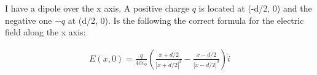 \documentclass[12pt]{article}
\begin{document}
I have a dipole over the x axis. A positive charge $q$ is located at (-d/2, 0)
and the negative one $-q$ at (d/2, 0). Is the following the correct formula for the
electric field along the x axis:

\begin{align*}
    E(x,0)=\frac{q}{4\pi\epsilon_0}\left(\frac{x+d/2}{|x+d/2|^3}-\frac{x-d/2}{|x-d/2|^3}\right)\hat{i}
\end{align*}
\end{document}
